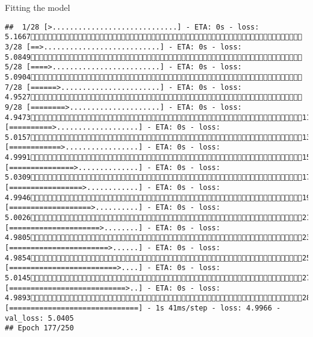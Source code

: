 \documentclass[
  ignorenonframetext,
]{beamer}
\begin{document}
\begin{frame}[fragile]{Fitting the model}
\begin{verbatim}
##  1/28 [>.............................] - ETA: 0s - loss: 5.1667 3/28 [==>...........................] - ETA: 0s - loss: 5.0849 5/28 [====>.........................] - ETA: 0s - loss: 5.0904 7/28 [======>.......................] - ETA: 0s - loss: 4.9527 9/28 [========>.....................] - ETA: 0s - loss: 4.947311/28 [==========>...................] - ETA: 0s - loss: 5.015713/28 [============>.................] - ETA: 0s - loss: 4.999115/28 [===============>..............] - ETA: 0s - loss: 5.030917/28 [=================>............] - ETA: 0s - loss: 4.994619/28 [===================>..........] - ETA: 0s - loss: 5.002621/28 [=====================>........] - ETA: 0s - loss: 4.980523/28 [=======================>......] - ETA: 0s - loss: 4.985425/28 [=========================>....] - ETA: 0s - loss: 5.014527/28 [===========================>..] - ETA: 0s - loss: 4.989328/28 [==============================] - 1s 41ms/step - loss: 4.9966 - val_loss: 5.0405
## Epoch 177/250

\end{verbatim}
\end{frame}
\end{document}
